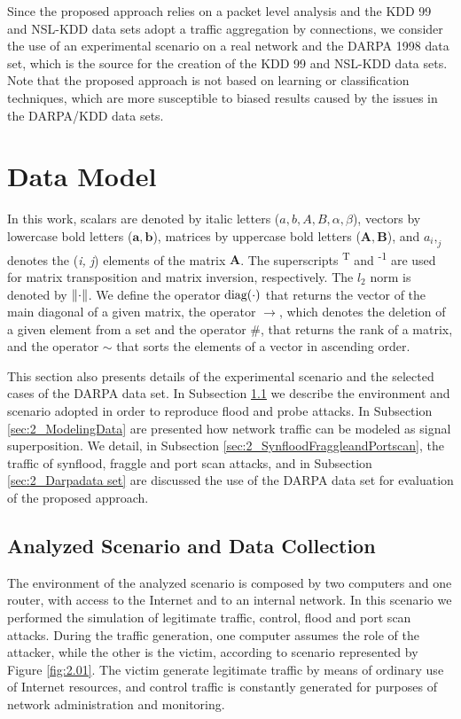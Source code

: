 Since the proposed approach relies on a packet level analysis and the KDD 99 and NSL-KDD data sets adopt a traffic aggregation by connections, we consider the use of an experimental scenario on a real network and the DARPA 1998 data set, which is the source for the creation of the KDD 99 and NSL-KDD data sets. Note that the proposed approach is not based on learning or classification techniques, which are more susceptible to biased results caused by the issues in the DARPA/KDD data sets.


\section{Data Model}
\label{sec:2_datamodel}

In this work, scalars are denoted by italic letters ($a, b, A, B, \alpha, \beta$), vectors by lowercase bold letters ($\pmb{a}, \pmb{b}$), matrices by uppercase bold letters ($\pmb{A}, \pmb{B}$), and $a_i,_j$ denotes the (\emph{i, j}) elements of the matrix $\pmb{A}$. The superscripts \textsuperscript{T} and \textsuperscript{-1} are used for matrix transposition and matrix inversion, respectively. The $l_2$ norm is denoted by $\lVert\cdot\rVert$. We define the operator $\rm diag(\cdot)$ that returns the vector of the main diagonal of a given matrix, the operator $\rightarrow$, which denotes the deletion of a given element from a set and the operator $\#$, that returns the rank of a matrix, and the operator $\sim$ that sorts the elements of a vector in ascending order.

This section also presents details of the experimental scenario and the selected cases of the DARPA data set. In Subsection \ref{sec:2_DataCollection} we describe the environment and scenario adopted in order to reproduce flood and probe attacks. In Subsection \ref{sec:2_ModelingData} are presented how network traffic can be modeled as signal superposition. We detail, in Subsection \ref{sec:2_SynfloodFraggleandPortscan}, the traffic of synflood, fraggle and port scan attacks, and in Subsection \ref{sec:2_Darpadata set} are discussed the use of the DARPA data set for evaluation of the proposed approach.

\subsection{Analyzed Scenario and Data Collection}
\label{sec:2_DataCollection}

The environment of the analyzed scenario is composed by two computers and one router, with access to the Internet and to an internal network. In this scenario we performed the simulation of legitimate traffic, control, flood and port scan attacks. During the traffic generation, one computer assumes the role of the attacker, while the other is the victim, according to scenario represented by Figure \ref{fig:2.01}. The victim generate legitimate traffic by means of ordinary use of Internet resources, and control traffic is constantly generated for purposes of network administration and monitoring.

